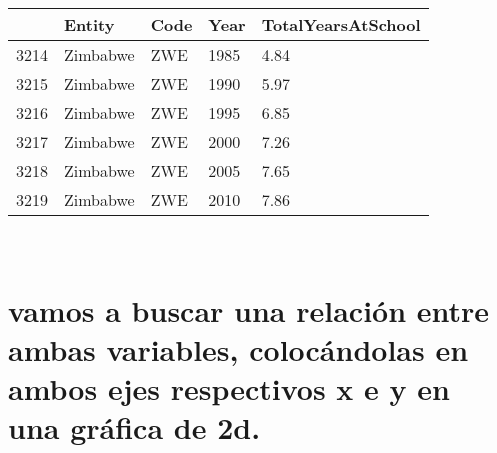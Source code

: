 \documentclass[11pt]{article}
\begin{document}
    
    \begin{tabular}{r|llll}
  & Entity & Code & Year & TotalYearsAtSchool\\
\hline
	3214 & Zimbabwe & ZWE      & 1985     & 4.84    \\
	3215 & Zimbabwe & ZWE      & 1990     & 5.97    \\
	3216 & Zimbabwe & ZWE      & 1995     & 6.85    \\
	3217 & Zimbabwe & ZWE      & 2000     & 7.26    \\
	3218 & Zimbabwe & ZWE      & 2005     & 7.65    \\
	3219 & Zimbabwe & ZWE      & 2010     & 7.86    \\
\end{tabular}


    
    \begin{center}
    \end{center}
    { \hspace*{\fill} \\}
    
    \hypertarget{vamos-a-buscar-una-relaciuxf3n-entre-ambas-variables-colocuxe1ndolas-en-ambos-ejes-respectivos-x-e-y-en-una-gruxe1fica-de-2d.}{%
\section{vamos a buscar una relación entre ambas variables, colocándolas
en ambos ejes respectivos x e y en una gráfica de
2d.}\label{vamos-a-buscar-una-relaciuxf3n-entre-ambas-variables-colocuxe1ndolas-en-ambos-ejes-respectivos-x-e-y-en-una-gruxe1fica-de-2d.}}
\end{document}
